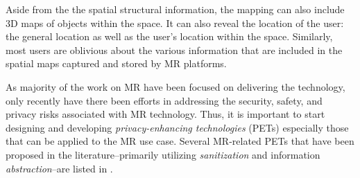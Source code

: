 
Aside from the the spatial structural information, the mapping can also include 3D maps of objects within the space. It can also reveal the location of the user: the general location as well as the user's location within the space. Similarly, most users are oblivious about the various information that are included in the spatial maps captured and stored by MR platforms.


As majority of the work on MR have been focused on delivering the technology, only recently have there been efforts in addressing the security, safety, and privacy risks associated with MR technology. Thus, it is important to start designing and developing \textit{privacy-enhancing technologies} (PETs) especially those that can be applied to the MR use case. Several MR-related PETs that have been proposed in the literature--primarily utilizing \textit{sanitization} and information \textit{abstraction}--are listed in \cite{deguzman2018security}. %

